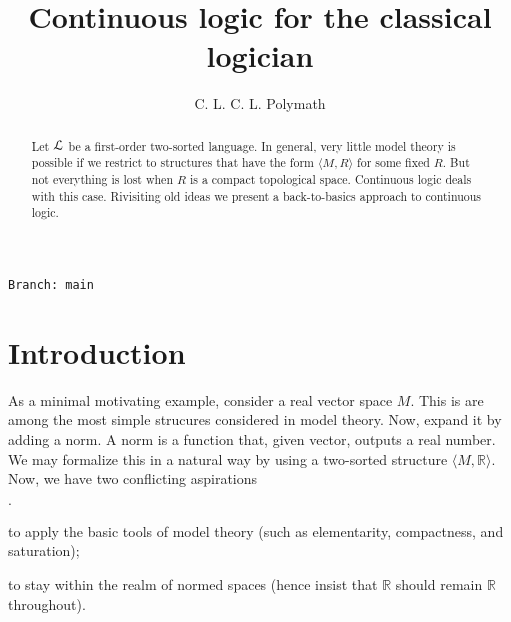 \documentclass[10pt,oneside]{amsproc}
\author{C. L. C. L. Polymath}
\newcommand{\mylabel}[1]{{#1}\hfill}
\renewenvironment{itemize}
  {\begin{list}{$\cdot$}{%
  \setlength{\parskip}{0mm}
  \setlength{\topsep}{.2\baselineskip}
  \setlength{\rightmargin}{0mm}
  \setlength{\listparindent}{0mm}
  \setlength{\itemindent}{0mm}
  \setlength{\labelwidth}{3ex}
  \setlength{\itemsep}{.2\baselineskip}
  \setlength{\parsep}{.2\baselineskip}
  \setlength{\partopsep}{0mm}
  \setlength{\labelsep}{1ex}
  \setlength{\leftmargin}{\labelwidth+\labelsep}
  \let\makelabel\mylabel}}{%
\end{list}}
\begin{document}
\title{Continuous logic for the classical logician}
\hfill\texttt{Branch:\ main\ \DTMnow}\bigskip
\maketitle
\raggedbottom

\def\forallM{\forall\raisebox{1.1ex}{\scaleto{\sf M}{.8ex}\kern-.2ex}}
\def\existsM{\exists\raisebox{1.1ex}{\scaleto{\sf M}{.8ex}\kern-.2ex}}
\def\forallR{\forall\raisebox{1.1ex}{\scaleto{\sf R}{.8ex}\kern-.2ex}}
\def\existsR{\exists\raisebox{1.1ex}{\scaleto{\sf R}{.8ex}\kern-.2ex}}

\newcommand\questionsign[1][2ex]{%
  \renewcommand\stacktype{L}%
  \scaleto{\stackon[-.6pt]{\color{red}$\triangle$}{\color{red}\bfseries\small ?}}{#1}%
}

\newcommand\dangersign[1][2ex]{%
  \renewcommand\stacktype{L}%
  \scaleto{\stackon[-.6pt]{\color{red}$\triangle$}{\color{red}\bfseries\small !}}{#1}%
}

\begin{abstract}
  Let ${\EuScript L}$ be a first-order two-sorted language.
  In general, very little model theory is possible if we restrict to structures that have the form $\langle M,R\rangle$ for some fixed $R$.
  But not everything is lost when $R$ is a compact topological space.
  Continuous logic deals with this case.
  Rivisiting old ideas we present a back-to-basics approach to continuous logic.
\end{abstract}
\section{Introduction}\label{intro}


\def\ceq#1#2#3{\parbox[t]{23ex}{$\displaystyle #1$}\parbox{6ex}{\hfil $#2$}{$\displaystyle #3$}}

As a minimal motivating example, consider a real vector space $M$.
This is are among the most simple strucures considered in model theory.
Now, expand it by adding a norm.
A norm is a function that, given vector, outputs a real number.
We may formalize this in a natural way by using a two-sorted structure $\langle M,\mathds{R}\rangle$.
Now, we have two conflicting aspirations
\begin{itemize}
  \item[i.] to apply the basic tools of model theory (such as elementarity, compactness, and saturation);
  \item[ii.] to stay within the realm of normed spaces (hence insist that 
  $\mathds{R}$ should remain $\mathds{R}$ throughout).
\end{itemize}
\end{document}
